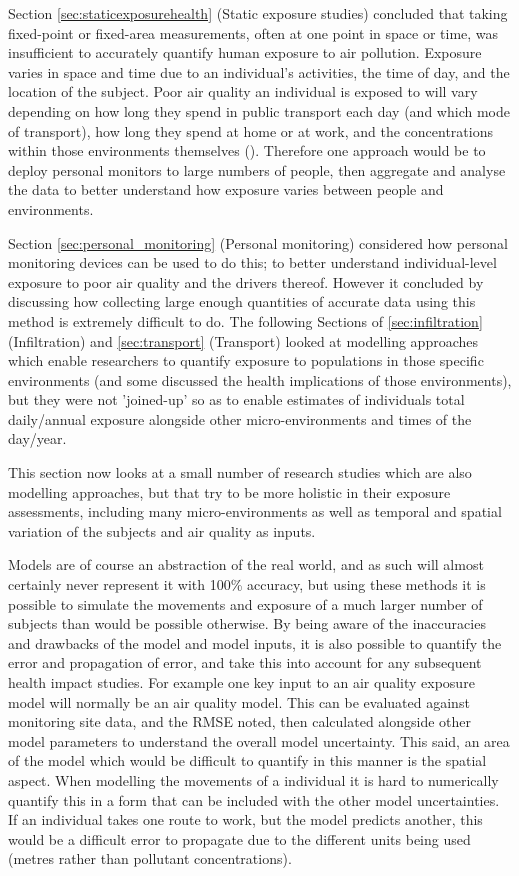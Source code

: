 Section \ref{sec:staticexposurehealth} (Static exposure studies) concluded that taking fixed-point or fixed-area measurements, often at one point in space or time, was insufficient to accurately quantify human exposure to air pollution. Exposure varies in space and time due to an individual’s activities, the time of day, and the location of the subject. Poor air quality an individual is exposed to will vary depending on how long they spend in public transport each day (and which mode of transport), how long they spend at home or at work, and the concentrations within those environments themselves (\cite{Ozkaynak2013}). Therefore one approach would be to deploy personal monitors to large numbers of people, then aggregate and analyse the data to better understand how exposure varies between people and environments.

Section \ref{sec:personal_monitoring} (Personal monitoring) considered how personal monitoring devices can be used to do this; to better understand individual-level exposure to poor air quality and the drivers thereof. However it concluded by discussing how collecting large enough quantities of accurate data using this method is extremely difficult to do. The following Sections of \ref{sec:infiltration} (Infiltration) and \ref{sec:transport} (Transport) looked at modelling approaches which enable researchers to quantify exposure to populations in those specific environments (and some discussed the health implications of those environments), but they were not 'joined-up' so as to enable estimates of individuals total daily/annual exposure alongside other micro-environments and times of the day/year.

This section now looks at a small number of research studies which are also modelling approaches, but that try to be more holistic in their exposure assessments, including many micro-environments as well as temporal and spatial variation of the subjects and air quality as inputs. 

Models are of course an abstraction of the real world, and as such will almost certainly never represent it with 100\% accuracy, but using these methods it is possible to simulate the movements and exposure of a much larger number of subjects than would be possible otherwise. By being aware of the inaccuracies and drawbacks of the model and model inputs, it is also possible to quantify the error and propagation of error, and take this into account for any subsequent health impact studies. For example one key input to an air quality exposure model will normally be an air quality model. This can be evaluated against monitoring site data, and the RMSE noted, then calculated alongside other model parameters to understand the overall model uncertainty. This said, an area of the model which would be difficult to quantify in this manner is the spatial aspect. When modelling the movements of a individual it is hard to numerically quantify this in a form that can be included with the other model uncertainties. If an individual takes one route to work, but the model predicts another, this would be a difficult error to propagate due to the different units being used (metres rather than pollutant concentrations).


